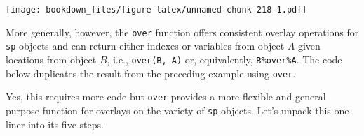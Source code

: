\documentclass[
]{krantz}
\makeatletter
\newenvironment{Shaded}{\begin{snugshade}}{\end{snugshade}}
\newcommand{\FloatTok}[1]{\textcolor[rgb]{0.06,0.06,0.06}{#1}}
\newcommand{\KeywordTok}[1]{\textcolor[rgb]{0.27,0.27,0.27}{\textbf{#1}}}
\newcommand{\NormalTok}[1]{#1}
\newcommand{\OperatorTok}[1]{\textcolor[rgb]{0.43,0.43,0.43}{\textbf{#1}}}
\newcommand{\StringTok}[1]{\textcolor[rgb]{0.5,0.5,0.5}{#1}}
\newenvironment{kframe}{%
\medskip{}
\setlength{\fboxsep}{.8em}
 \def\at@end@of@kframe{}%
 \ifinner\ifhmode%
  \def\at@end@of@kframe{\end{minipage}}%
  \begin{minipage}{\columnwidth}%
 \fi\fi%
 \def\FrameCommand##1{\hskip\@totalleftmargin \hskip-\fboxsep
 \colorbox{shadecolor}{##1}\hskip-\fboxsep
     \hskip-\linewidth \hskip-\@totalleftmargin \hskip\columnwidth}%
 \MakeFramed {\advance\hsize-\width
   \@totalleftmargin\z@ \linewidth\hsize
   \@setminipage}}%
 {\par\unskip\endMakeFramed%
 \at@end@of@kframe}
\renewenvironment{Shaded}{\begin{kframe}}{\end{kframe}}
\makeatother
\begin{document}
\texttt{[image: bookdown\_files/figure-latex/unnamed-chunk-218-1.pdf]}

More generally, however, the \texttt{over} function offers consistent overlay operations for \texttt{sp} objects and can return either indexes or variables from object \(A\) given locations from object \(B\), i.e., \texttt{over(B,\ A)} or, equivalently, \texttt{B\%over\%A}. The code below duplicates the result from the preceding example using \texttt{over}.

\begin{Shaded}
\end{Shaded}

Yes, this requires more code but \texttt{over} provides a more flexible and general purpose function for overlays on the variety of \texttt{sp} objects. Let's unpack this one-liner into its five steps.

\begin{Shaded}
\end{Shaded}
\end{document}
